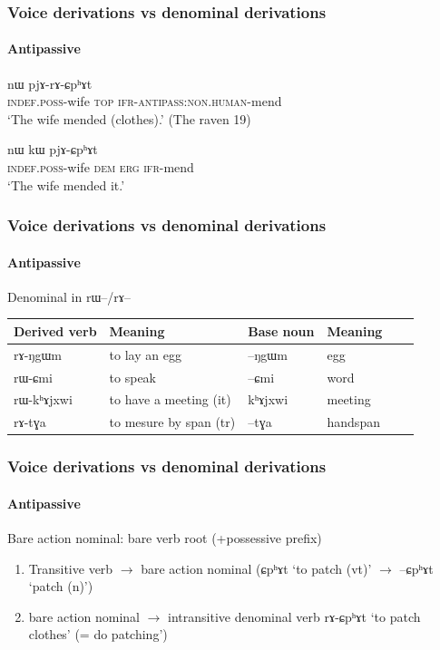\documentclass[xcolor=table]{beamer}
\newcommand{\ipa}[1]{{\phon \mbox{#1}}} %
\begin{document}
\begin{frame} 
\frametitle{Voice derivations vs denominal derivations} 
\framesubtitle{Antipassive} 
  \begin{exe}
\ex
\gll \ipa{tɤ-rʑaβ} 	\ipa{nɯ} 	\ipa{pjɤ-rɤ-ɕpʰɤt}   \\
    \textsc{indef.poss}-wife \textsc{top} \textsc{ifr-antipass:non.human}-mend \\
 \glt    `The wife mended (clothes).' (The raven 19)
\end{exe} 
 
   \begin{exe}
\ex
\gll \ipa{tɤ-rʑaβ} 	\ipa{nɯ} 	\ipa{kɯ}	\ipa{pjɤ-ɕpʰɤt}   \\
    \textsc{indef.poss}-wife \textsc{dem} \textsc{erg} \textsc{ifr}-mend \\
 \glt    `The wife mended it.' 
\end{exe} 

\end{frame}   
 
\begin{frame} 
\frametitle{Voice derivations vs denominal derivations} 
\framesubtitle{Antipassive} 
Denominal in \ipa{rɯ--}/\ipa{rɤ--}
\begin{tabular}{llllll}
\toprule
 Derived verb& Meaning &Base noun  & Meaning \\
\midrule
  \ipa{rɤ-ŋgɯm} & to lay an egg & \ipa{--ŋgɯm} &egg \\
  \ipa{rɯ-ɕmi} & to speak & \ipa{--ɕmi} & word  \\
  \ipa{rɯ-kʰɤjxwi} & to have a meeting (it) & \ipa{kʰɤjxwi} & meeting \\
 \midrule
\ipa{rɤ-tɣa}  &	 to mesure by span  (tr)&	\ipa{--tɣa}  &	handspan  \\
 \bottomrule
\end{tabular}
\end{frame}    
 
 \begin{frame} 
\frametitle{Voice derivations vs denominal derivations} 
\framesubtitle{Antipassive} 
 
Bare action nominal: bare verb root (+possessive prefix)
 \begin{enumerate}
\item Transitive verb $\rightarrow$ bare action nominal (\ipa{ɕpʰɤt} `to patch (vt)' $\rightarrow$ \ipa{--ɕpʰɤt} `patch (n)')
\item bare action nominal $\rightarrow$ intransitive denominal verb \ipa{rɤ-ɕpʰɤt} `to patch clothes' (= do patching')
\end{enumerate}
 
\end{frame}    
 
\end{document}
